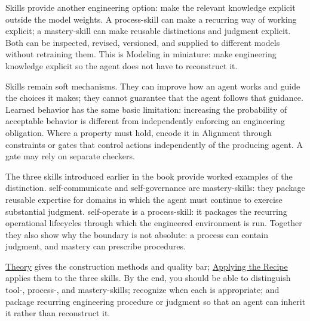 Skills provide another engineering option: make the relevant knowledge explicit outside the model weights. A process-skill can make a recurring way of working explicit; a mastery-skill can make reusable distinctions and judgment explicit. Both can be inspected, revised, versioned, and supplied to different models without retraining them. This is Modeling in miniature: make engineering knowledge explicit so the agent does not have to reconstruct it.

Skills remain soft mechanisms. They can improve how an agent works and guide the choices it makes; they cannot guarantee that the agent follows that guidance. Learned behavior has the same basic limitation: increasing the probability of acceptable behavior is different from independently enforcing an engineering obligation. Where a property must hold, encode it in Alignment through constraints or gates that control actions independently of the producing agent. A gate may rely on separate checkers.

The three skills introduced earlier in the book provide worked examples of the distinction. self-communicate and self-governance are mastery-skills: they package reusable expertise for domains in which the agent must continue to exercise substantial judgment. self-operate is a process-skill: it packages the recurring operational lifecycles through which the engineered environment is run. Together they also show why the boundary is not absolute: a process can contain judgment, and mastery can prescribe procedures.

\href{appendix-e-theory.html}{Theory} gives the construction methods and quality bar; \href{appendix-e-applying-the-recipe.html}{Applying the Recipe} applies them to the three skills. By the end, you should be able to distinguish tool-, process-, and mastery-skills; recognize when each is appropriate; and package recurring engineering procedure or judgment so that an agent can inherit it rather than reconstruct it.
